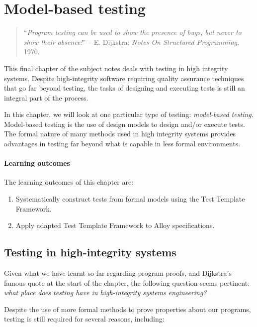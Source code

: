 \chapter{Model-based testing}

\begin{quote}
``\emph{Program testing can be used to show the presence of bugs, but never to show their absence!}'' -- \textnormal{E. Dijkstra: {\em Notes On Structured Programming}, 1970.}
\end{quote}


This final chapter of the subject notes deals with testing in high integrity systems. Despite high-integrity software requiring quality assurance techniques that go far beyond testing, the tasks of designing and executing tests is still an integral part of the process.

In this chapter, we will look at one particular type of testing: \emph{model-based testing}. Model-based testing is the use of design models to design and/or execute tests. The formal nature of many methods used in high integrity systems provides advantages in testing far beyond what is capable in less formal environments.


\subsubsection*{Learning outcomes}

The learning outcomes of this chapter are:

\begin{enumerate}

 \item Systematically construct tests from formal models using the Test Template Framework.

 \item Apply adapted Test Template Framework to Alloy specifications.

\end{enumerate}


\section{Testing in high-integrity systems}


Given what we have learnt so far regarding program proofs, and Dijkstra's famous quote at the start of the chapter, the following question seems pertinent: \emph{what place does testing have in high-integrity systems engineering?}

Despite the use of more formal methods to prove properties about our programs, testing is still required for several reasons, including:

